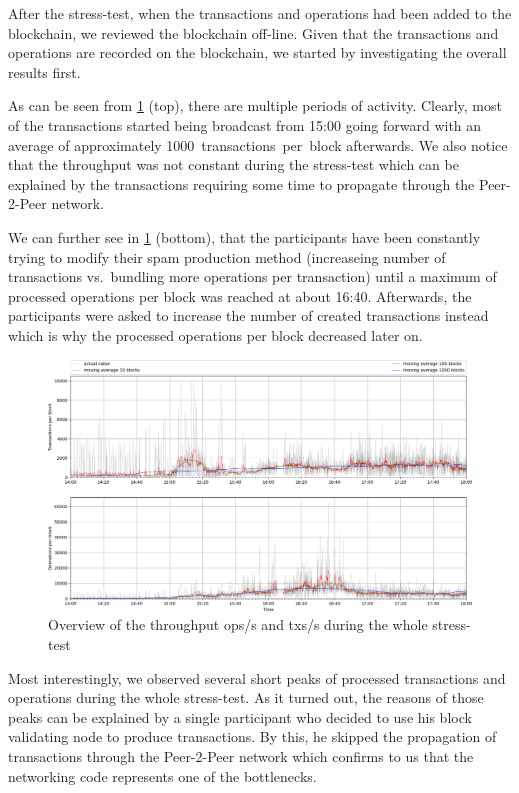 After the stress-test, when the transactions and operations had been added to
the blockchain, we reviewed the blockchain off-line. Given
that the transactions and operations are recorded on the blockchain, we
started by investigating the overall results first.

As can be seen from \cref{fig:tpsall} (top), there are multiple periods of
activity. Clearly, most of the transactions started being
broadcast from 15:00 going forward with an average of approximately
\SI{1000}{transactions per block} afterwards. We also notice that the
throughput was not constant during the stress-test which can be explained by the
transactions requiring some time to propagate through the Peer-2-Peer network.

We can further see in \cref{fig:tpsall} (bottom), that the participants have
been constantly trying to modify their spam production method (increaseing number
of transactions vs.\ bundling more operations per transaction) until a maximum
of processed operations per block was reached at about 16:40. Afterwards, the
participants were asked to increase the number of created transactions
instead which is why the processed operations per block decreased later on.

\begin{figure}[!htp]
 \centering
 \includegraphics[width=\linewidth]{figures/stress-test-overview.png}
 \caption{Overview of the throughput ops/s and txs/s during the whole stress-test}
 \label{fig:tpsall}
\end{figure}

Most interestingly, we observed several short peaks of processed transactions and
operations during the whole stress-test. As it turned out, the reasons of those
peaks can be explained by a single participant who decided to use his
block validating node to produce transactions. By this, he skipped the
propagation of transactions through the Peer-2-Peer network which confirms to
us that the networking code represents one of the bottlenecks.


